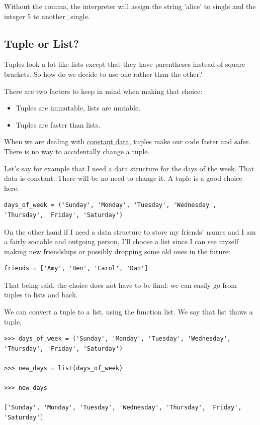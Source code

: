\documentclass{article}
\begin{document}
Without the comma, the interpreter will assign the string 'alice' to single and the integer 5 to another{\_}single.

\subsection{Tuple or List?}

Tuples look a lot like lists except that they have parentheses instead of square brackets.  So how do we decide to use one rather than the other?

There are two factors to keep in mind when making that choice:

\begin{itemize}
\item Tuples are immutable, lists are mutable.

\item Tuples are faster than lists. 
\end{itemize}

When we are dealing with \underline{constant data}, tuples make our code faster and safer.  There is no way to accidentally change a tuple.

Let's say for example that I need a data structure for the days of the week.  That data is constant.  There will be no need to change it.  A tuple is a good choice here.

\begin{lstlisting}
days_of_week = ('Sunday', 'Monday', 'Tuesday', 'Wednesday', 'Thursday', 'Friday', 'Saturday')
\end{lstlisting}

On the other hand if I need a data structure to store my friends' names and I am a fairly sociable and outgoing person, I'll choose a list since I can see myself making new friendships or possibly dropping some old ones in the future: 

\begin{lstlisting}
friends = ['Amy', 'Ben', 'Carol', 'Dan']
\end{lstlisting}

That being said, the choice does not have to be final:  we can easily go from tuples to lists and back.

We can convert a tuple to a list, using the function list.  We say that list thaws a tuple.

\begin{lstlisting}
>>> days_of_week = ('Sunday', 'Monday', 'Tuesday', 'Wednesday', 'Thursday', 'Friday', 'Saturday')

>>> new_days = list(days_of_week)

>>> new_days

['Sunday', 'Monday', 'Tuesday', 'Wednesday', 'Thursday', 'Friday', 'Saturday']
\end{lstlisting}
\end{document}
